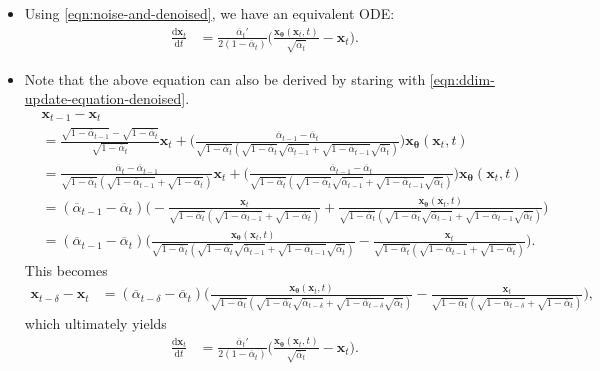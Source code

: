 \documentclass[10pt]{article}
\newcommand{\dee}{\mathrm{d}}
\newcommand{\ve}[1]{\mathbf{#1}}
\newcommand{\ves}[1]{\boldsymbol{#1}}
\newcommand{\ov}[1]{\overline{#1}}
\begin{document}
\begin{itemize}
  \item Using \eqref{eqn:noise-and-denoised}, we have an equivalent ODE:
  \begin{align} \label{eqn:ddim-ode-denoised}
    \frac{\dee \ve{x}_t}{\dee t} &= \frac{\ov{\alpha}_t'}{2 (1- \ov{\alpha}_t)} \bigg( \frac{\ve{x}_{\ves{\theta}}(\ve{x}_t,t)}{\sqrt{\ov{\alpha}_t}} - \ve{x}_t \bigg).
  \end{align}

  \item Note that the above equation can also be derived by staring with \eqref{eqn:ddim-update-equation-denoised}.
  \begin{align*}
    &\ve{x}_{t-1} - \ve{x}_t \\
    &= \frac{\sqrt{1-\ov{\alpha}_{t-1}} - \sqrt{1-\ov{\alpha}_t}}{\sqrt{1-\ov{\alpha}_t}} \ve{x}_t  
    + \bigg(  \frac{ \ov{\alpha}_{t-1} - \ov{\alpha}_t }{\sqrt{1-\ov{\alpha}_t}(\sqrt{1-\ov{\alpha}_{t}}\sqrt{\ov{\alpha}_{t-1}} + \sqrt{1-\ov{\alpha}_{t-1}}\sqrt{\ov{\alpha}_t}) } \bigg) \ve{x}_{\ves{\theta}}(\ve{x}_t, t) \\
    &= \frac{ \ov{\alpha}_t - \ov{\alpha}_{t-1} }{\sqrt{1-\ov{\alpha}_t}(\sqrt{1-\ov{\alpha}_{t-1}} + \sqrt{1-\ov{\alpha}_t})} \ve{x}_t  
    + \bigg(  \frac{ \ov{\alpha}_{t-1} - \ov{\alpha}_t }{\sqrt{1-\ov{\alpha}_t}(\sqrt{1-\ov{\alpha}_{t}}\sqrt{\ov{\alpha}_{t-1}} + \sqrt{1-\ov{\alpha}_{t-1}}\sqrt{\ov{\alpha}_t}) } \bigg) \ve{x}_{\ves{\theta}}(\ve{x}_t, t) \\
    &= (\ov{\alpha}_{t-1}-\ov{\alpha}_t ) \bigg( 
      -\frac{ \ve{x}_t   }{\sqrt{1-\ov{\alpha}_t}(\sqrt{1-\ov{\alpha}_{t-1}} + \sqrt{1-\ov{\alpha}_t})} 
      + \frac{  \ve{x}_{\ves{\theta}}(\ve{x}_t, t) }{\sqrt{1-\ov{\alpha}_t}(\sqrt{1-\ov{\alpha}_{t}}\sqrt{\ov{\alpha}_{t-1}} + \sqrt{1-\ov{\alpha}_{t-1}}\sqrt{\ov{\alpha}_t}) } 
    \bigg) \\
    &= (\ov{\alpha}_{t-1}-\ov{\alpha}_t ) \bigg( 
      \frac{  \ve{x}_{\ves{\theta}}(\ve{x}_t, t) }{\sqrt{1-\ov{\alpha}_t}(\sqrt{1-\ov{\alpha}_{t}}\sqrt{\ov{\alpha}_{t-1}} + \sqrt{1-\ov{\alpha}_{t-1}}\sqrt{\ov{\alpha}_t}) } 
      -\frac{ \ve{x}_t   }{\sqrt{1-\ov{\alpha}_t}(\sqrt{1-\ov{\alpha}_{t-1}} + \sqrt{1-\ov{\alpha}_t})} 
    \bigg).
  \end{align*}
  This becomes
  \begin{align*}
    \ve{x}_{t-\delta} - \ve{x}_t 
    &= (\ov{\alpha}_{t-\delta}-\ov{\alpha}_t ) \bigg( 
      \frac{  \ve{x}_{\ves{\theta}}(\ve{x}_t, t) }{\sqrt{1-\ov{\alpha}_t}(\sqrt{1-\ov{\alpha}_{t}}\sqrt{\ov{\alpha}_{t-\delta}} + \sqrt{1-\ov{\alpha}_{t-\delta}}\sqrt{\ov{\alpha}_t}) } 
      -\frac{ \ve{x}_t   }{\sqrt{1-\ov{\alpha}_t}(\sqrt{1-\ov{\alpha}_{t-\delta}} + \sqrt{1-\ov{\alpha}_t})} 
    \bigg),
  \end{align*}
  which ultimately yields
  \begin{align*}
    \frac{\dee \ve{x}_t}{\dee t} &= \frac{\ov{\alpha}_t'}{2 (1- \ov{\alpha}_t)} \bigg( \frac{\ve{x}_{\ves{\theta}}(\ve{x}_t,t)}{\sqrt{\ov{\alpha}_t}} - \ve{x}_t \bigg).
  \end{align*}
\end{itemize}
\end{document}
